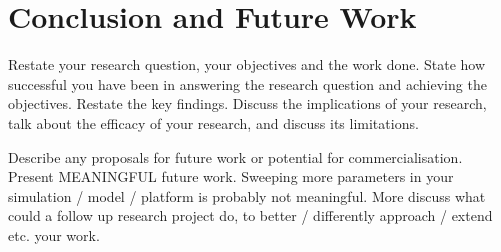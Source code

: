 
\section{Conclusion and Future Work}
\label{sec:Conclusion}

Restate your research question, your objectives and the work done. State how successful you have been in answering the research question and achieving the objectives. Restate the key findings. Discuss the implications of your research, talk about the efficacy of your research, and discuss its limitations. 

Describe any proposals for future work or potential for commercialisation. Present MEANINGFUL future work. Sweeping more parameters in your simulation / model / platform is probably not meaningful. More discuss what could a follow up research project do, to better / differently approach / extend etc. your work.
